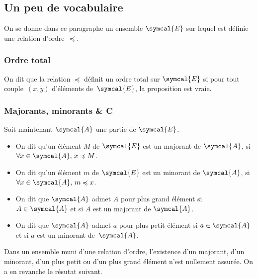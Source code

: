 % 
\subsection{Un peu de vocabulaire}
On se donne dans ce paragraphe un ensemble $\symcal{E}$ sur lequel est définie une relation d'ordre~$\preccurlyeq$.
\subsubsection{Ordre total}
 On dit que la relation $\preccurlyeq$ définit un ordre total sur $\symcal{E}$ si pour tout couple~$(x,y)$ d'éléments de~$\symcal{E}$, la proposition 
  est vraie. 

\subsubsection{Majorants, minorants \& C}
Soit maintenant $\symcal{A}$ une partie de $\symcal{E}$.

\begin{itemize}
\item On dit qu'un élément $M$ de $\symcal{E}$ est un majorant de $\symcal{A}$, si $\forall x\in \symcal{A},\, x\preccurlyeq M$.
\item On dit qu'un élément $m$ de $\symcal{E}$ est un minorant de $\symcal{A}$, si $\forall x\in \symcal{A},\, m\preccurlyeq x$.
\item On dit que $\symcal{A}$ admet $A$ pour plus grand élément si $A\in \symcal{A}$ et si $A$ est un majorant de $\symcal{A}$.
\item On dit que $\symcal{A}$ admet $a$ pour plus petit élément si $a\in \symcal{A}$ et si $a$ est un minorant de~$\symcal{A}$.
\end{itemize}



\begin{remark}
Dans un ensemble muni d'une relation d'ordre, l'existence d'un majorant, d'un minorant, d'un plus petit ou d'un plus grand élément n'est nullement assurée. On a en revanche le résutat suivant.
\end{remark}


